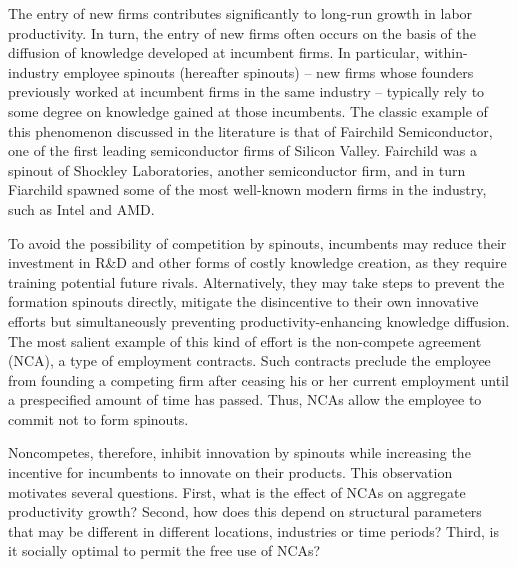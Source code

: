 \documentclass[11pt,english]{article}
\begin{document}
The entry of new firms contributes significantly to long-run growth in labor productivity. In turn, the entry of new firms often occurs on the basis of the diffusion of knowledge developed at incumbent firms. In particular, within-industry employee spinouts (hereafter spinouts) -- new firms whose founders previously worked at incumbent firms in the same industry -- typically rely to some degree on knowledge gained at those incumbents. The classic example of this phenomenon discussed in the literature is that of Fairchild Semiconductor, one of the first leading semiconductor firms of Silicon Valley. Fairchild was a spinout of Shockley Laboratories, another semiconductor firm, and in turn Fiarchild spawned some of the most well-known modern firms in the industry, such as Intel and AMD. 

To avoid the possibility of competition by spinouts, incumbents may reduce their investment in R\&D and other forms of costly knowledge creation, as they require training potential future rivals. Alternatively, they may take steps to prevent the formation spinouts directly, mitigate the disincentive to their own innovative efforts but simultaneously preventing productivity-enhancing knowledge diffusion. The most salient example of this kind of effort is the non-compete agreement (NCA), a type of employment contracts. Such contracts preclude the employee from founding a competing firm after ceasing his or her current employment until a prespecified amount of time has passed. Thus, NCAs allow the employee to commit not to form spinouts. 

Noncompetes, therefore, inhibit innovation by spinouts while increasing the incentive for incumbents to innovate on their products. This observation motivates several questions. First, what is the effect of NCAs on aggregate productivity growth? Second, how does this depend on structural parameters that may be different in different locations, industries or time periods? Third, is it socially optimal to permit the free use of NCAs?
\end{document}
